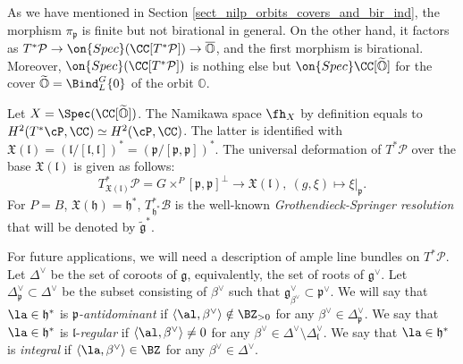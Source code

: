 \documentclass[12pt]{amsart}
\begin{document}
    \begin{rmk}
    As we have mentioned in Section \ref{sect_nilp_orbits_covers_and_bir_ind}, the morphism $\pi_{\mathfrak{p}}$ is finite but not birational in general. On the other hand, it factors as $T^*\mathcal{P} \rightarrow \on{Spec}(\CC[T^*\mathcal{P}]) \rightarrow \overline{\mathbb{O}}$, and the first morphism is birational. Moreover, $\on{Spec}(\CC[T^*\mathcal{P}])$ is nothing else but $\on{Spec}\CC[\widetilde{\mathbb{O}}]$ for the cover $\widetilde{\mathbb{O}}=\Bind_L^G \{0\}$ of the orbit $\mathbb{O}$. 
    \end{rmk}
    
    Let $X=\Spec(\CC[\widetilde{\mathbb{O}}])$. The Namikawa space $\fh_X$ by definition equals to $H^2(T^*\cP, \CC)\simeq H^2(\cP, \CC)$. The latter is identified with $\mathfrak{X}(\mathfrak{l})=(\mathfrak{l}/[\mathfrak{l},\mathfrak{l}])^*=(\mathfrak{p}/[\mathfrak{p},\mathfrak{p}])^*$. 
    The universal deformation of $T^*\mathcal{P}$ over the base $\mathfrak{X}(\mathfrak{l})$ is given as follows:
    \begin{equation*}
    T^*_{\mathfrak{X}(\mathfrak{l})}\mathcal{P} = G \times^P [\mathfrak{p},\mathfrak{p}]^{\perp} \rightarrow \mathfrak{X}(\mathfrak{l}),~(g,\xi) \mapsto \xi|_{\mathfrak{p}}.
    \end{equation*}
    For $P=B$, $\mathfrak{X}(\mathfrak{h})=\mathfrak{h}^*$,  $T^*_{\mathfrak{h}^*}\mathcal{B}$ is the well-known {\emph{Grothendieck-Springer resolution}} that will be denoted by $\widetilde{\mathfrak{g}}^*$. 



    For future applications, we will need a description of ample line bundles on $T^*\mathcal{P}$. Let $\Delta^\vee$ be the set of coroots of $\mathfrak{g}$, equivalently, the set of roots of $\mathfrak{g}^\vee$.
    Let  $\Delta^\vee_{\mathfrak{p}} \subset \Delta^\vee$ be the subset consisting of $\beta^\vee$ such that $\mathfrak{g}^\vee_{\beta^\vee} \subset \mathfrak{p}^\vee$.
    We will say that $\la \in \mathfrak{h}^*$ is {\it  $\mathfrak{p}$-antidominant} if $\langle \al,\beta^{\vee} \rangle \notin \BZ_{> 0}$ for any $\beta^\vee \in \Delta_{\mathfrak{p}}^\vee$.
	We say that  $\la \in \mathfrak{h}^*$ is $\mathfrak{l}$-{\em{regular}} if $\langle \al,\beta^{\vee} \rangle \neq 0$ for any $\beta^\vee \in \Delta^\vee \setminus \Delta_{\mathfrak{l}}^\vee$. 
	We say that $\la \in \mathfrak{h}^*$ is {\em{integral}} if $\langle\la,\beta^{\vee}\rangle \in \BZ$ for any $\beta^\vee \in \Delta^\vee$. 
\end{document}
